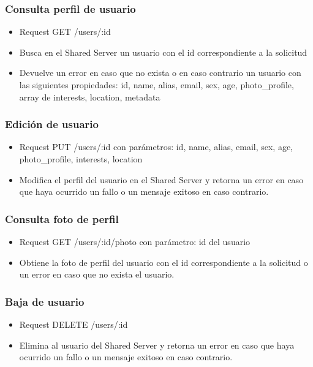 \documentclass[letterpaper,10pt,english]{sphinxmanual}
\begin{document}
\subsubsection{Consulta perfil de usuario}
\label{manuals:consulta-perfil-de-usuario}\begin{itemize}
\item {} 
Request GET /users/:id

\item {} 
Busca en el Shared Server un usuario con el id correspondiente a la solicitud

\item {} 
Devuelve un error en caso que no exista o en caso contrario un usuario con las siguientes propiedades: id, name, alias, email, sex, age, photo\_profile, array de interests, location, metadata

\end{itemize}


\subsubsection{Edición de usuario}
\label{manuals:edicion-de-usuario}\begin{itemize}
\item {} 
Request PUT /users/:id con parámetros: id, name, alias, email, sex, age, photo\_profile, interests, location

\item {} 
Modifica el perfil del usuario en el Shared Server y retorna un error en caso que haya ocurrido un fallo o un mensaje exitoso en caso contrario.

\end{itemize}


\subsubsection{Consulta foto de perfil}
\label{manuals:consulta-foto-de-perfil}\begin{itemize}
\item {} 
Request GET /users/:id/photo con parámetro: id del usuario

\item {} 
Obtiene la foto de perfil del usuario con el id correspondiente a la solicitud o un error en caso que no exista el usuario.

\end{itemize}


\subsubsection{Baja de usuario}
\label{manuals:baja-de-usuario}\begin{itemize}
\item {} 
Request DELETE /users/:id

\item {} 
Elimina al usuario del Shared Server y retorna un error en caso que haya ocurrido un fallo o un mensaje exitoso en caso contrario.

\end{itemize}
\end{document}
